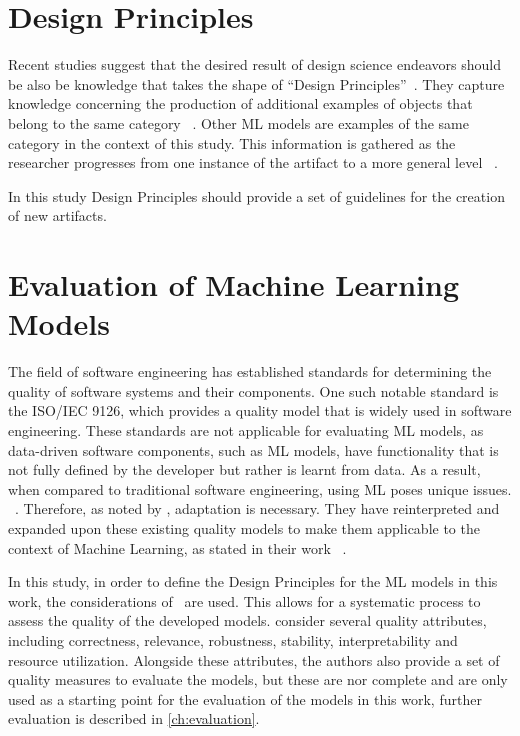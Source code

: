 \section{Design Principles}\label{sec:design-principles}
Recent studies suggest that the desired result of design science endeavors should be also be knowledge that takes the
shape of
``Design Principles''~\cite{baskerville2010explanatory, sein2011action, gregor_positioningpresentingdesign_2013}.
They capture knowledge concerning the production of additional examples of objects that belong to the same
category
~\cite[p. 39]{sein2011action}.
Other ML models are examples of the same category in the context of this study.
This information is gathered as the researcher progresses from one instance of the artifact to a more general level
~\cite[p. 37]{chandra2016making}.

In this study Design Principles should provide a set of guidelines for the creation of new artifacts.


\section{Evaluation of Machine Learning Models}\label{sec:evaluation-of-machine-learning-models}
The field of software engineering has established standards for determining the quality of software systems and their
components.
One such notable standard is the ISO/IEC 9126, which provides a quality model that is widely used in
software engineering.
These standards are not applicable for evaluating \ac{ML} models, as data-driven software components, such
as \ac{ML} models, have functionality that is not fully defined by the developer but rather is learnt from data.
As a result, when compared to traditional software engineering, using ML poses unique issues.
~\cite[p. 2]{siebert2022construction}.
Therefore, as noted by \cite{siebert2022construction}, adaptation is necessary.
They have reinterpreted and expanded upon these existing quality models to make them applicable to the context of
Machine Learning, as stated in their work
~\cite[p. 1]{siebert2022construction}.

In this study, in order to define the Design Principles for the \ac{ML} models in this work, the
considerations of~\cite[]{siebert2022construction} are used.
This allows for a systematic process to assess the quality of the developed models.
\cite{siebert2022construction} consider several quality attributes, including
correctness, relevance, robustness, stability, interpretability and resource utilization.
Alongside these attributes, the authors also provide a set of quality measures to evaluate the
models, but these are nor complete and are only used as a starting point for the evaluation of the
models in this work, further evaluation is described in \cref{ch:evaluation}.


